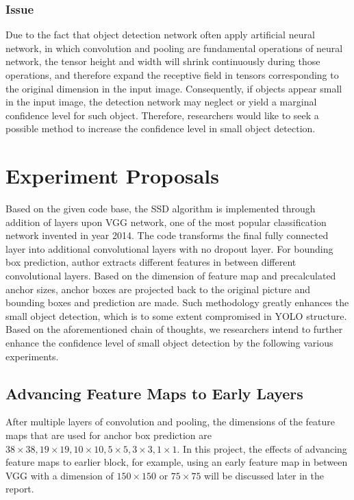\documentclass{article}
\begin{document}
\subsubsection{Issue}

Due to the fact that object detection network often apply artificial neural network, in which convolution and pooling are fundamental operations of neural network, the tensor height and width will shrink continuously during those operations, and therefore expand the receptive field in tensors corresponding to the original dimension in the input image. Consequently, if objects appear small in the input image, the detection network may neglect or yield a marginal confidence level for such object. Therefore, researchers would like to seek a possible method to increase the confidence level in small object detection. 

\section{Experiment Proposals}

Based on the given code base, the SSD algorithm is implemented through addition of layers upon VGG network, one of the most popular classification network invented in year 2014. The code transforms the final fully connected layer into additional convolutional layers with no dropout layer. For bounding box prediction, author extracts different features in between different convolutional layers. Based on the dimension of feature map and precalculated anchor sizes, anchor boxes are projected back to the original picture and bounding boxes and prediction are made. Such methodology greatly enhances the small object detection, which is to some extent compromised in YOLO structure. Based on the aforementioned chain of thoughts, we researchers intend to further enhance the confidence level of small object detection by the following various experiments.

\subsection{Advancing Feature Maps to Early Layers}

After multiple layers of convolution and pooling, the dimensions of the feature maps that are used for anchor box prediction are $38 \times 38, 19 \times 19, 10 \times 10, 5 \times 5, 3 \times 3, 1 \times 1 $. In this project, the effects of advancing feature maps to earlier block, for example, using an early feature map in between VGG with a dimension of $150 \times 150$ or $75 \times 75$ will be discussed later in the report.
\end{document}
